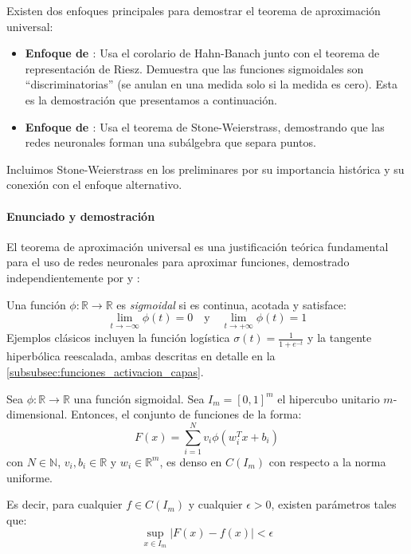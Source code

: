 Existen dos enfoques principales para demostrar el teorema de aproximación universal:
\begin{itemize}
	\item \textbf{Enfoque de \citet{cybenko1989}}: Usa el corolario de Hahn-Banach junto con el teorema de representación de Riesz. Demuestra que las funciones sigmoidales son ``discriminatorias'' (se anulan en una medida solo si la medida es cero). Esta es la demostración que presentamos a continuación.
	\item \textbf{Enfoque de \citet{hornik1989}}: Usa el teorema de Stone-Weierstrass, demostrando que las redes neuronales forman una subálgebra que separa puntos.
\end{itemize}
Incluimos Stone-Weierstrass en los preliminares por su importancia histórica y su conexión con el enfoque alternativo.

\paragraph{Enunciado y demostración}

El teorema de aproximación universal es una justificación teórica fundamental para el uso de redes neuronales para aproximar funciones, demostrado independientemente por \citet{cybenko1989} y \citet{hornik1989}:

\begin{definition}\label{def:funcion_sigmoidal}
	Una función \(\phi: \mathbb{R} \to \mathbb{R}\) es \textit{sigmoidal} si es continua, acotada y satisface:
	\[
		\lim_{t \to -\infty} \phi(t) = 0 \quad \text{y} \quad \lim_{t \to +\infty} \phi(t) = 1
	\]
	Ejemplos clásicos incluyen la función logística \(\sigma(t) = \frac{1}{1+e^{-t}}\) y la tangente hiperbólica reescalada, ambas descritas en detalle en la \autoref{subsubsec:funciones_activacion_capas}.
\end{definition}

\begin{theorem}\label{thm:aproximacion_universal}
	Sea \(\phi: \mathbb{R} \to \mathbb{R}\) una función sigmoidal. Sea \(I_m = [0,1]^m\) el hipercubo unitario \(m\)-dimensional. Entonces, el conjunto de funciones de la forma:
	\[
		F(x) = \sum_{i=1}^{N} v_i \phi(w_i^T x + b_i)
	\]
	con \(N \in \mathbb{N}\), \(v_i, b_i \in \mathbb{R}\) y \(w_i \in \mathbb{R}^m\), es denso en \(C(I_m)\) con respecto a la norma uniforme.

	Es decir, para cualquier \(f \in C(I_m)\) y cualquier \(\epsilon > 0\), existen parámetros tales que:
	\[
		\sup_{x \in I_m} |F(x) - f(x)| < \epsilon
	\]
\end{theorem}

